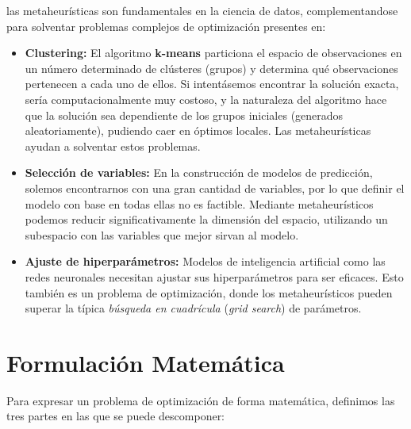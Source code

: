 \documentclass[12pt,a4paper]{book}
\begin{document}
las metaheurísticas son fundamentales en la ciencia de datos, complementandose para solventar problemas complejos de optimización presentes en:
\begin{itemize}
    \item \textbf{Clustering:} El algoritmo \textbf{k-means} particiona el espacio de observaciones en un número determinado de clústeres (grupos) y determina qué observaciones pertenecen a cada uno de ellos. 
    Si intentásemos encontrar la solución exacta, sería computacionalmente muy costoso, y la naturaleza del algoritmo hace que la solución sea dependiente de los grupos iniciales (generados aleatoriamente), pudiendo caer en óptimos locales.
    Las metaheurísticas ayudan a solventar estos problemas.
    
    \item \textbf{Selección de variables:} En la construcción de modelos de predicción, solemos encontrarnos con una gran cantidad de variables, por lo que definir el modelo con base en todas ellas no es factible. Mediante metaheurísticos podemos 
    reducir significativamente la dimensión del espacio, utilizando un subespacio con las variables que mejor sirvan al modelo.
    
    \item \textbf{Ajuste de hiperparámetros:} Modelos de inteligencia artificial como las redes neuronales necesitan ajustar sus hiperparámetros para ser eficaces. Esto también es un problema de optimización, donde los metaheurísticos pueden superar la típica \textit{búsqueda en cuadrícula} (\textit{grid search}) de parámetros.
\end{itemize}
\section{Formulación Matemática}

Para expresar un problema de optimización de forma matemática, definimos las tres partes en las que se puede descomponer:
\end{document}
